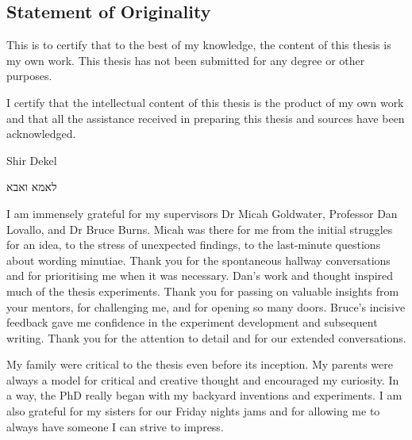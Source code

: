 \documentclass[a4paper, nobind]{templates/ociamthesis}
\newenvironment{originality}%
{   \begin{alwayssingle}\chapter*{Statement of Originality}
    \thispagestyle{empty}
    \pagestyle{empty}
    \setlength{\baselineskip}{\frontmatterbaselineskip}
  }
  {\end{alwayssingle}}
\theoremstyle{definition}
\theoremstyle{definition}
\theoremstyle{definition}
\theoremstyle{definition}
\theoremstyle{remark}
\begin{document}
\begin{romanpages}

\maketitle

\begin{originality}
 	This is to certify that to the best of my knowledge, the content of this thesis
  is my own work. This thesis has not been submitted for any degree or other
  purposes.

  I certify that the intellectual content of this thesis is the product of my own
  work and that all the assistance received in preparing this thesis and sources
  have been acknowledged.

  \vspace{3cm}

  Shir Dekel
\end{originality}

\begin{dedication}
  \foreignlanguage{hebrew}{לאמא ואבא}
\end{dedication}

\begin{acknowledgements}
 	I am immensely grateful for my supervisors Dr Micah Goldwater, Professor Dan
  Lovallo, and Dr Bruce Burns. Micah was there for me from the initial struggles
  for an idea, to the stress of unexpected findings, to the last-minute questions
  about wording minutiae. Thank you for the spontaneous hallway conversations and
  for prioritising me when it was necessary. Dan's work and thought inspired much
  of the thesis experiments. Thank you for passing on valuable insights from your
  mentors, for challenging me, and for opening so many doors. Bruce's incisive
  feedback gave me confidence in the experiment development and subsequent
  writing. Thank you for the attention to detail and for our extended
  conversations.

  My family were critical to the thesis even before its inception. My parents were
  always a model for critical and creative thought and encouraged my curiosity.
  In a way, the PhD really began with my backyard inventions and experiments. I am
  also grateful for my sisters for our Friday nights jams and for allowing me to
  always have someone I can strive to impress.


\end{acknowledgements}
\end{romanpages}
\end{document}
